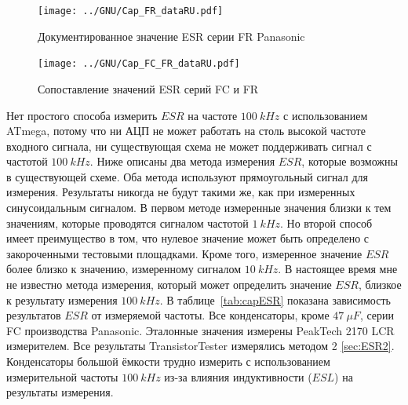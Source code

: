 \begin{figure}[H]
  \centering
    \texttt{[image: ../GNU/Cap\_FR\_dataRU.pdf]}
  \caption{Документированное значение ESR серии FR Panasonic}
  \label{fig:Cap_FR_data}
\end{figure}

\begin{figure}[H]
  \centering
    \texttt{[image: ../GNU/Cap\_FC\_FR\_dataRU.pdf]}
  \caption{Сопоставление значений ESR серий FC и FR}
  \label{fig:Cap_FC_FR_data}
\end{figure}

Нет простого способа измерить \(ESR\) на частоте \(100~kHz\) с использованием ATmega,
потому что ни АЦП не может работать на столь высокой частоте входного сигнала, ни существующая схема
не может поддерживать сигнал с частотой \(100~kHz\).
Ниже описаны два метода измерения \(ESR\), которые возможны в существующей схеме.
Оба метода используют прямоугольный сигнал для измерения. Результаты никогда не будут такими же, как 
при измеренных синусоидальным сигналом.
В первом методе измеренные значения близки к тем значениям, которые проводятся сигналом частотой \(1~kHz\).
Но второй способ имеет преимущество в том, что нулевое значение может быть определено с закороченными 
тестовыми площадками.
Кроме того, измеренное значение \(ESR\) более близко к значению, измеренному сигналом \(10~kHz\).
В настоящее время мне не известно метода измерения, который может определить значение \(ESR\), близкое к 
результату измерения \(100~kHz\).
В таблице~\ref{tab:capESR} показана зависимость результатов \(ESR\) от измеряемой частоты.
Все конденсаторы, кроме \(47~\mu F\), серии FC производства Panasonic.
Эталонные значения измерены PeakTech 2170 LCR измерителем.
Все результаты TransistorTester измерялись методом 2 \ref{sec:ESR2}.
Конденсаторы большой ёмкости трудно измерить с использованием измерительной частоты \(100~kHz\)
из-за влияния индуктивности (\(ESL\)) на результаты измерения.

